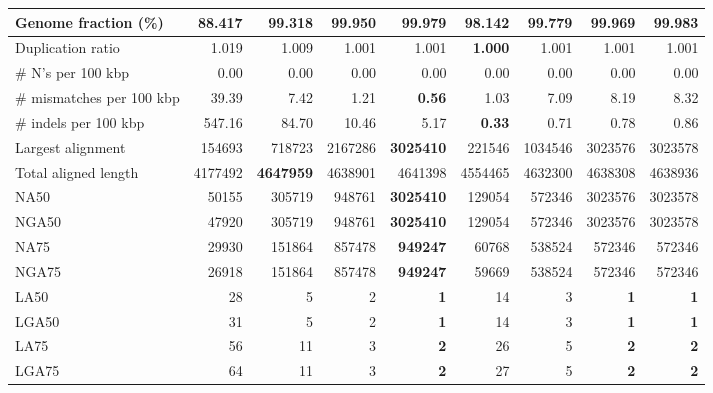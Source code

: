 \documentclass[12pt,a4paper]{article}
\begin{document}
\begin{table}[ht]
\begin{center}
\begin{tabular}{|l*{8}{|r}|}
Genome fraction (\%) & 88.417 & 99.318 & 99.950 & 99.979 & 98.142 & 99.779 & 99.969 & {\bf 99.983} \\ \hline
Duplication ratio & 1.019 & 1.009 & 1.001 & 1.001 & {\bf 1.000} & 1.001 & 1.001 & 1.001 \\ \hline
\# N's per 100 kbp & 0.00 & 0.00 & 0.00 & 0.00 & 0.00 & 0.00 & 0.00 & 0.00 \\ \hline
\# mismatches per 100 kbp & 39.39 & 7.42 & 1.21 & {\bf 0.56} & 1.03 & 7.09 & 8.19 & 8.32 \\ \hline
\# indels per 100 kbp & 547.16 & 84.70 & 10.46 & 5.17 & {\bf 0.33} & 0.71 & 0.78 & 0.86 \\ \hline
Largest alignment & 154693 & 718723 & 2167286 & {\bf 3025410} & 221546 & 1034546 & 3023576 & 3023578 \\ \hline
Total aligned length & 4177492 & {\bf 4647959} & 4638901 & 4641398 & 4554465 & 4632300 & 4638308 & 4638936 \\ \hline
NA50 & 50155 & 305719 & 948761 & {\bf 3025410} & 129054 & 572346 & 3023576 & 3023578 \\ \hline
NGA50 & 47920 & 305719 & 948761 & {\bf 3025410} & 129054 & 572346 & 3023576 & 3023578 \\ \hline
NA75 & 29930 & 151864 & 857478 & {\bf 949247} & 60768 & 538524 & 572346 & 572346 \\ \hline
NGA75 & 26918 & 151864 & 857478 & {\bf 949247} & 59669 & 538524 & 572346 & 572346 \\ \hline
LA50 & 28 & 5 & 2 & {\bf 1} & 14 & 3 & {\bf 1} & {\bf 1} \\ \hline
LGA50 & 31 & 5 & 2 & {\bf 1} & 14 & 3 & {\bf 1} & {\bf 1} \\ \hline
LA75 & 56 & 11 & 3 & {\bf 2} & 26 & 5 & {\bf 2} & {\bf 2} \\ \hline
LGA75 & 64 & 11 & 3 & {\bf 2} & 27 & 5 & {\bf 2} & {\bf 2} \\ \hline
\end{tabular}
\end{center}
\end{table}
\end{document}
